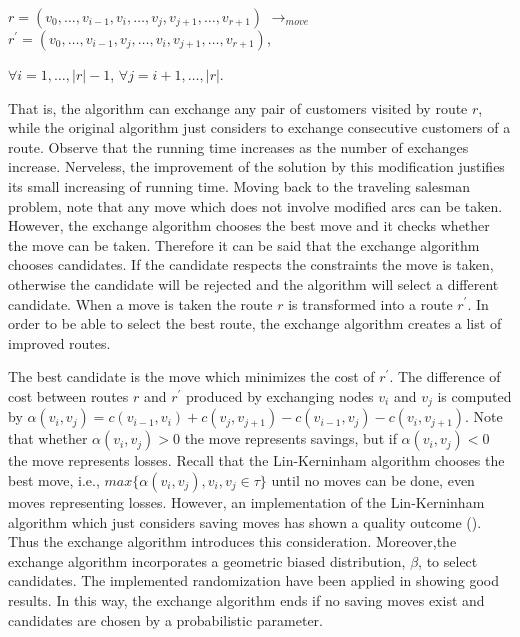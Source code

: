 $r=(v_{0},\dots,v_{i-1},v_{i},\dots,v_{j}, v_{j+1},\dots,v_{r+1})$ $\rightarrow_{move}$
$r^{'}=(v_{0},\dots,v_{i-1},v_{j},\dots,v_{i},v_{j+1},\dots,v_{r+1})$,

$\forall i = 1,\dots,|r| - 1$, $\forall j= i+1,\dots,|r| $.

That is, the algorithm can exchange any pair of customers visited by route $r$, while the original algorithm just considers to exchange consecutive customers of a route. Observe that the running time increases as the number of exchanges increase. Nerveless, the improvement of the solution by this modification justifies its small increasing of running time. Moving back to the traveling salesman problem, note that any move which does not involve modified arcs can be taken. However, the exchange algorithm chooses the best move and it checks whether the move can be taken. Therefore it can be said that the exchange algorithm chooses candidates. If the candidate respects the constraints the move is taken, otherwise the candidate will be rejected and the algorithm will select a different candidate. When a move is taken the route $r$ is transformed into a route $r^{'}$. In order to be able to select the best route, the exchange algorithm creates a list of improved routes.

The best candidate is the move which minimizes the cost of $r^{'}$. The difference of cost between routes $r$ and $r^{'}$ produced by exchanging nodes $v_{i}$ and $v_{j}$ is computed by $\alpha(v_{i},v_{j}) = c(v_{i-1},v_{i}) + c(v_{j},v_{j+1} ) - c(v_{i-1},v_{j} )- c(v_{i},v_{j+1})$. Note that whether $\alpha(v_{i},v_{j})>0$ the move represents savings, but if $\alpha(v_{i},v_{j})<0$ the move represents losses. Recall that the Lin-Kerninham algorithm chooses the best move, i.e., $max\{\alpha(v_{i},v_{j}), v_{i}, v_{j} \in \tau \} $ until no moves can be done, even moves representing losses. However, an implementation of the Lin-Kerninham algorithm which just considers saving moves has shown a quality outcome (\cite{Helsgaun}). Thus the exchange algorithm introduces this consideration. Moreover,the exchange algorithm incorporates a geometric biased distribution, $\beta$, to select candidates. The implemented randomization have been applied in \cite{Juan} showing good results. In this way, the exchange algorithm ends if no saving moves exist and candidates are chosen by a probabilistic parameter. 

